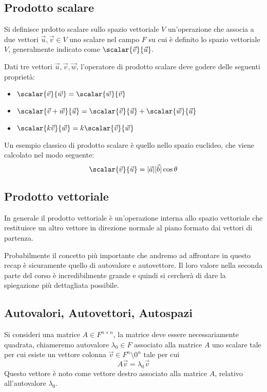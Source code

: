 \subsection{Prodotto scalare}
Si definisce prdotto scalare sullo spazio vettoriale $V$ un'operazione che associa a due vettori $\vec{u}, \vec{v} \in V$ uno scalare nel campo $F$ su cui è definito lo spazio vettoriale $V$, generalmente indicato come $\scalar{\vec{v}}{\vec{u}}$.

Dati tre vettori $\vec{u}, \vec{v}, \vec{w}$, l'operatore di prodotto scalare deve godere delle seguenti proprietà:
\begin{itemize}
    \item $\scalar{\vec{v}}{\vec{w}} = \scalar{\vec{w}}{\vec{v}}$
    \item $\scalar{\vec{v} + \vec{w}}{\vec{u}} = \scalar{\vec{v}}{\vec{u}} + \scalar{\vec{w}}{\vec{u}}$
    \item $\scalar{k\vec{v}}{\vec{w}} = k\scalar{\vec{v}}{\vec{w}}$
\end{itemize}
Un esempio classico di prodotto scalare è quello nello spazio euclideo, che viene calcolato nel modo seguente:
\begin{equation*}
    \scalar{\vec{v}}{\vec{u}} = |\vec{a}| |\vec{b}| \cos{\theta}
\end{equation*}
\subsection{Prodotto vettoriale}
In generale il prodotto vettoriale è un'operazione interna allo spazio vettoriale che restituisce un altro vettore in direzione normale al piano formato dai vettori di partenza.

Probabilmente il concetto più importante che andremo ad affrontare in questo recap è sicuramente quello di autovalore e autovettore. Il loro valore nella seconda parte del corso è incredibilmente grande e quindi si cercherà di dare la spiegazione più dettagliata possibile.
\subsection{Autovalori, Autovettori, Autospazi}
Si consideri una matrice $A \in F^{n \times n}$, la matrice deve essere necessariamente quadrata, chiameremo autovalore $\lambda_0 \in F$ associato alla matrice $A$ uno scalare tale per cui esiste un vettore colonna $\vec{v} \in F^n \setminus {0^n}$ tale per cui
\begin{equation}
    A\vec{v} = \lambda_0\vec{v}
\end{equation}
Questo vettore è noto come vettore destro associato alla matrice $A$, relativo all'autovalore $\lambda_0$.


